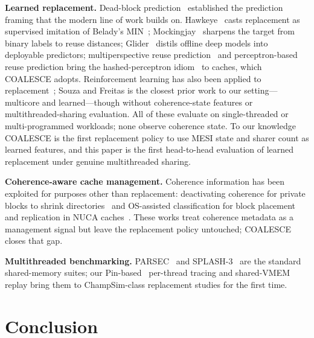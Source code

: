 \documentclass[conference]{IEEEtran}
\begin{document}
\textbf{Learned replacement.} Dead-block prediction~\cite{khan2010sdbp} established the prediction framing that the modern line of work builds on. Hawkeye~\cite{jain2016hawkeye} casts replacement as supervised imitation of Belady's MIN~\cite{belady1966study}; Mockingjay~\cite{shah2022mockingjay} sharpens the target from binary labels to reuse distances; Glider~\cite{shi2019glider} distils offline deep models into deployable predictors; multiperspective reuse prediction~\cite{jimenez2017multiperspective} and perceptron-based reuse prediction bring the hashed-perceptron idiom~\cite{jimenez2001perceptron} to caches, which COALESCE adopts. Reinforcement learning has also been applied to replacement~\cite{souza2024rl}; Souza and Freitas is the closest prior work to our setting---multicore and learned---though without coherence-state features or multithreaded-sharing evaluation. All of these evaluate on single-threaded or multi-programmed workloads; none observe coherence state. To our knowledge COALESCE is the first replacement policy to use MESI state and sharer count as learned features, and this paper is the first head-to-head evaluation of learned replacement under genuine multithreaded sharing.

\textbf{Coherence-aware cache management.} Coherence information has been exploited for purposes other than replacement: deactivating coherence for private blocks to shrink directories~\cite{cuesta2011coherence} and OS-assisted classification for block placement and replication in NUCA caches~\cite{hardavellas2009rnuca}. These works treat coherence metadata as a management signal but leave the replacement policy untouched; COALESCE closes that gap.

\textbf{Multithreaded benchmarking.} PARSEC~\cite{bienia2008parsec} and SPLASH-3~\cite{sakalis2016splash3} are the standard shared-memory suites; our Pin-based~\cite{luk2005pin} per-thread tracing and shared-VMEM replay bring them to ChampSim-class replacement studies for the first time.

\section{Conclusion}
\end{document}
